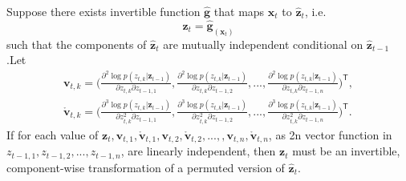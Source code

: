 

\appendix
\begin{lemma} \label{lemma: 1}
Suppose there exists invertible function $\hat{\mathbf{g}}$ that maps $\mathbf{x}_t$ to $\hat{\mathbf{z}}_t$, i.e.
\begin{equation}
\label{eq: hatz_xt_invertible_function}
    \hat{\mathbf{z}}_t=\hat{\mathbf{g}}_(\mathbf{x}_t)
\end{equation}
such that the components of $\hat{\mathbf{z}}_t$ are mutually independent conditional on $\hat{\mathbf{z}}_{t-1}$ .Let
\begin{equation}
\label{eq: second_third_derivatives}
 \begin{split}
    \mathbf{v}_{t,k} =
    \Big(\frac{\partial^{2}\log p(z_{t,k}|\mathbf{z}_{t-1}) }{\partial z_{t,k}\partial z_{t-1,1}},\frac{\partial^{2}\log p(z_{t,k}|\mathbf{z}_{t-1})}{\partial z_{t,k}\partial z_{t-1,2}},...,
        \frac{\partial^{2}\log p(z_{t,k}|\mathbf{z}_{t-1})}{\partial z_{t,k}\partial z_{t-1,n}}\Big)^{\mathsf{T}},\\
    \mathring{\mathbf{v}}_{t,k}=
\Big(\frac{\partial^{3}\log p(z_{t,k}|\mathbf{z}_{t-1})}{\partial z_{t,k}^{2}\partial z_{t-1,1}},\frac{\partial^{3}\log p(z_{t,k}|\mathbf{z}_{t-1})}{\partial z_{t,k}^{2}\partial z_{t-1,2}},...,
    \frac{\partial^{3}\log p(z_{t,k}|\mathbf{z}_{t-1})}{\partial z_{t,k}^{2}\partial z_{t-1,n}}\Big)^{\mathsf{T}}.
    \end{split}
\end{equation}
If for each value of $\mathbf{z}_t,\mathbf{v}_{t,1},\mathring{\mathbf{v}}_{t,1},\mathbf{v}_{t,2},\mathring{\mathbf{v}}_{t,2},...,,\mathbf{v}_{t,n},\mathring{\mathbf{v}}_{t,n}$, as 2n vector function in $z_{t-1,1},z_{t-1,2},...,z_{t-1,n}$, are linearly independent, then $\mathbf{z}_t$ must be an invertible, component-wise transformation of a permuted version of $\hat{\mathbf{z}}_t$.
\end{lemma}

